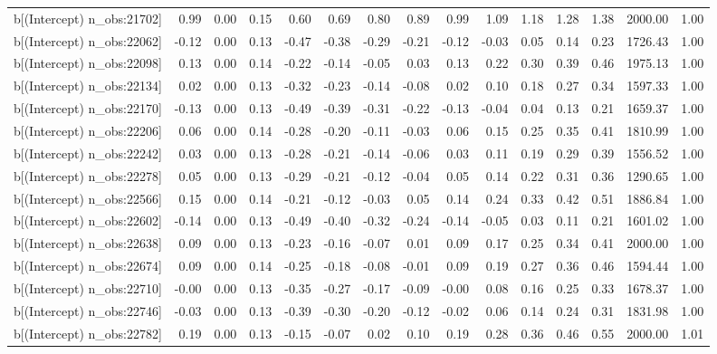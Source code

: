 \begin{table}[ht]
\begin{tabular}{rrrrrrrrrrrrrrr}
  b[(Intercept) n\_obs:21702] & 0.99 & 0.00 & 0.15 & 0.60 & 0.69 & 0.80 & 0.89 & 0.99 & 1.09 & 1.18 & 1.28 & 1.38 & 2000.00 & 1.00 \\ 
  b[(Intercept) n\_obs:22062] & -0.12 & 0.00 & 0.13 & -0.47 & -0.38 & -0.29 & -0.21 & -0.12 & -0.03 & 0.05 & 0.14 & 0.23 & 1726.43 & 1.00 \\ 
  b[(Intercept) n\_obs:22098] & 0.13 & 0.00 & 0.14 & -0.22 & -0.14 & -0.05 & 0.03 & 0.13 & 0.22 & 0.30 & 0.39 & 0.46 & 1975.13 & 1.00 \\ 
  b[(Intercept) n\_obs:22134] & 0.02 & 0.00 & 0.13 & -0.32 & -0.23 & -0.14 & -0.08 & 0.02 & 0.10 & 0.18 & 0.27 & 0.34 & 1597.33 & 1.00 \\ 
  b[(Intercept) n\_obs:22170] & -0.13 & 0.00 & 0.13 & -0.49 & -0.39 & -0.31 & -0.22 & -0.13 & -0.04 & 0.04 & 0.13 & 0.21 & 1659.37 & 1.00 \\ 
  b[(Intercept) n\_obs:22206] & 0.06 & 0.00 & 0.14 & -0.28 & -0.20 & -0.11 & -0.03 & 0.06 & 0.15 & 0.25 & 0.35 & 0.41 & 1810.99 & 1.00 \\ 
  b[(Intercept) n\_obs:22242] & 0.03 & 0.00 & 0.13 & -0.28 & -0.21 & -0.14 & -0.06 & 0.03 & 0.11 & 0.19 & 0.29 & 0.39 & 1556.52 & 1.00 \\ 
  b[(Intercept) n\_obs:22278] & 0.05 & 0.00 & 0.13 & -0.29 & -0.21 & -0.12 & -0.04 & 0.05 & 0.14 & 0.22 & 0.31 & 0.36 & 1290.65 & 1.00 \\ 
  b[(Intercept) n\_obs:22566] & 0.15 & 0.00 & 0.14 & -0.21 & -0.12 & -0.03 & 0.05 & 0.14 & 0.24 & 0.33 & 0.42 & 0.51 & 1886.84 & 1.00 \\ 
  b[(Intercept) n\_obs:22602] & -0.14 & 0.00 & 0.13 & -0.49 & -0.40 & -0.32 & -0.24 & -0.14 & -0.05 & 0.03 & 0.11 & 0.21 & 1601.02 & 1.00 \\ 
  b[(Intercept) n\_obs:22638] & 0.09 & 0.00 & 0.13 & -0.23 & -0.16 & -0.07 & 0.01 & 0.09 & 0.17 & 0.25 & 0.34 & 0.41 & 2000.00 & 1.00 \\ 
  b[(Intercept) n\_obs:22674] & 0.09 & 0.00 & 0.14 & -0.25 & -0.18 & -0.08 & -0.01 & 0.09 & 0.19 & 0.27 & 0.36 & 0.46 & 1594.44 & 1.00 \\ 
  b[(Intercept) n\_obs:22710] & -0.00 & 0.00 & 0.13 & -0.35 & -0.27 & -0.17 & -0.09 & -0.00 & 0.08 & 0.16 & 0.25 & 0.33 & 1678.37 & 1.00 \\ 
  b[(Intercept) n\_obs:22746] & -0.03 & 0.00 & 0.13 & -0.39 & -0.30 & -0.20 & -0.12 & -0.02 & 0.06 & 0.14 & 0.24 & 0.31 & 1831.98 & 1.00 \\ 
  b[(Intercept) n\_obs:22782] & 0.19 & 0.00 & 0.13 & -0.15 & -0.07 & 0.02 & 0.10 & 0.19 & 0.28 & 0.36 & 0.46 & 0.55 & 2000.00 & 1.01 \\ 

\end{tabular}
\end{table}
